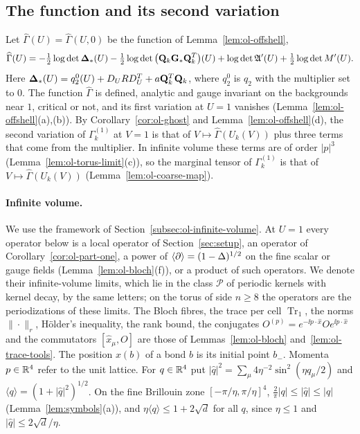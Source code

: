 \subsection{The function and its second variation}\label{subsec:ol-vp-function}

Let $\widehat\Gamma(U)=\widehat\Gamma(U,0)$ be the function of Lemma~\ref{lem:ol-offshell},
\[
\widehat\Gamma(U)=-\tfrac12\log\det\boldsymbol{\Delta}_*(U)-\tfrac12\log\det\big(\mathbf Q_k\mathbf G_*\mathbf Q_k^T\big)(U)+\log\det\mathfrak A'(U)+\tfrac12\log\det M'(U).
\]
Here $\boldsymbol{\Delta}_*(U)=q_2^0(U)+D_URD_U^T+a\mathbf Q_k^T\mathbf Q_k$, where $q_2^0$ is $q_2$ with the multiplier set to $0$. The function $\widehat\Gamma$ is defined, analytic and gauge invariant on the backgrounds near $1$, critical or not, and its first variation at $U=1$ vanishes (Lemma~\ref{lem:ol-offshell}(a),(b)). By Corollary~\ref{cor:ol-ghost} and Lemma~\ref{lem:ol-offshell}(d), the second variation of $\Gamma^{(1)}_k$ at $V=1$ is that of $V\mapsto\widehat\Gamma(U_k(V))$ plus three terms that come from the multiplier. In infinite volume these terms are of order $|p|^3$ (Lemma~\ref{lem:ol-torus-limit}(c)), so the marginal tensor of $\Gamma^{(1)}_k$ is that of $V\mapsto\widehat\Gamma(U_k(V))$ (Lemma~\ref{lem:ol-coarse-map}).

\paragraph{Infinite volume.} We use the framework of Section~\ref{subsec:ol-infinite-volume}. At $U=1$ every operator below is a local operator of Section~\ref{sec:setup}, an operator of Corollary~\ref{cor:ol-part-one}, a power of $\langle\partial\rangle=(1-\Delta)^{1/2}$ on the fine scalar or gauge fields (Lemma~\ref{lem:ol-bloch}(f)), or a product of such operators. We denote their infinite-volume limits, which lie in the class $\mathscr P$ of periodic kernels with kernel decay, by the same letters; on the torus of side $n\ge8$ the operators are the periodizations of these limits. The Bloch fibres, the trace per cell $\operatorname{Tr}_1$, the norms $\|\cdot\|_r$, H\"older's inequality, the rank bound, the conjugates $O^{(p)}=e^{-\ii p\cdot\hat x}Oe^{\ii p\cdot\hat x}$ and the commutators $[\hat x_\mu,O]$ are those of Lemmas~\ref{lem:ol-bloch} and~\ref{lem:ol-trace-tools}. The position $x(b)$ of a bond $b$ is its initial point $b_-$. Momenta $p\in\mathbb R^4$ refer to the unit lattice. For $q\in\mathbb R^4$ put $|\hat q|^2=\sum_\mu4\eta^{-2}\sin^2(\eta q_\mu/2)$ and $\langle q\rangle=(1+|\hat q|^2)^{1/2}$. On the fine Brillouin zone $[-\pi/\eta,\pi/\eta]^4$, $\frac2\pi|q|\le|\hat q|\le|q|$ (Lemma~\ref{lem:symbols}(a)), and $\eta\langle q\rangle\le1+2\sqrt d$ for all $q$, since $\eta\le1$ and $|\hat q|\le2\sqrt d/\eta$.


